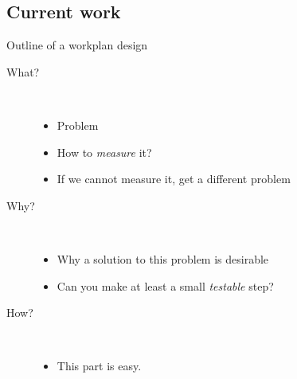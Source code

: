 \documentclass[hyperref={colorlinks=true}]{beamer}
\begin{document}
\subsection{Current work}
\begin{frame}{Outline of a workplan design}
\begin{description}
  \item[What?] \hfill \\
  \begin{itemize}
    \item Problem
    \item How to \emph{measure} it?
    \item If we cannot measure it, get a different problem
  \end{itemize}
  \pause
  \item[Why?] \hfill \\
  \begin{itemize}
    \item Why a solution to this problem is desirable
    \item Can you make at least a small \emph{testable} step?
  \end{itemize}
  \item[How?] \hfill \\
  \begin{itemize}
    \item This part is easy.
  \end{itemize}
\end{description}
\end{frame}
\end{document}
